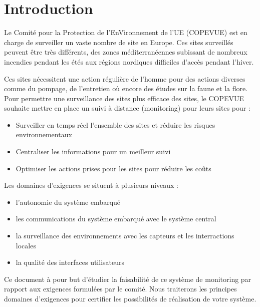 \section{Introduction}

Le Comité pour la Protection de l'EnVironnement de l'UE (COPEVUE) est en charge de surveiller un vaste nombre de site en Europe. Ces sites surveillés peuvent être très différents, des zones méditerranéennes subissant de nombreux incendies pendant les étés aux régions nordiques difficiles d'accès pendant l'hiver. 

Ces sites nécessitent une action régulière de l'homme pour des actions diverses comme du pompage, de l'entretien où encore des études sur la faune et la flore. Pour permettre une surveillance des sites plus efficace des sites, le COPEVUE souhaite mettre en place un suivi à distance (monitoring) pour leurs sites pour : 

\begin{itemize}
\item Surveiller en temps réel l'ensemble des sites et réduire les risques environnementaux
\item Centraliser les informations pour un meilleur suivi
\item Optimiser les actions prises pour les sites pour réduire les coûts
\end{itemize}

Les domaines d'exigences se situent à plusieurs niveaux : 

\begin{itemize}
\item l'autonomie du système embarqué
\item les communications du système embarqué avec le système central
\item la surveillance des environnements avec les capteurs et les interractions locales
\item la qualité des interfaces utilisateurs
\end{itemize}

Ce document à pour but d'étudier la faisabilité de ce système de monitoring par rapport aux exigences formulées par le comité. Nous traiterons les principes domaines d'exigences pour certifier les possibilités de réalisation de votre système.

 
